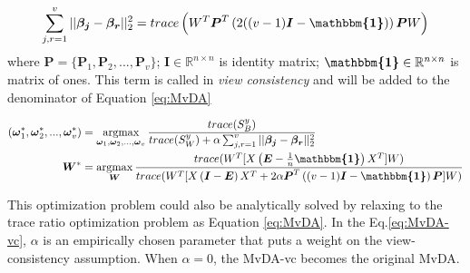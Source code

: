         \begin{equation}
            \sum_{j,r=1}^{v}||\boldsymbol{\beta_j} - \boldsymbol{\beta_r}||_2^2 = trace\left(W^{T}\boldsymbol{P}^{T}\left(2((v - 1)\boldsymbol{I} - \boldsymbol{\mathbbm{1}})\right)\boldsymbol{P}W\right)
        \end{equation}
        where $\boldsymbol{P} = \{\boldsymbol{P}_1,\boldsymbol{P}_2,...,\boldsymbol{P}_v\}$; $\boldsymbol{I} \in \mathbb{R}^{n\times n}$ is identity matrix; $\boldsymbol{\mathbbm{1}} \in \mathbb{R}^{n\times n}$ is matrix of ones.
        This term is called in \cite{kan2016multi} {\itshape view consistency} and will be added to the denominator of Equation \eqref{eq:MvDA}

        \begin{align}
            (\boldsymbol{\omega}_1^*,\boldsymbol{\omega}_2^*, ..., \boldsymbol{\omega}_v^*) &= \operatorname*{argmax}_{\boldsymbol{\omega}_1, \boldsymbol{\omega}_2,..., \boldsymbol{\omega}_v}\frac{trace({S}_B^y)}{trace({S}_W^y) + \alpha\sum_{j,r=1}^{v}||\boldsymbol{\beta_j} - \boldsymbol{\beta_r}||_2^2}\\
            \boldsymbol{W}^* &= \operatorname*{argmax}_{\boldsymbol{W}}\frac{trace(W^{T}[X\left(\boldsymbol{E} - \frac{1}{n}\boldsymbol{\mathbbm{1}}\right)X^{T}]W)}{trace(W^{T}[X\left(\boldsymbol{I} - \boldsymbol{E}\right)X^{T} + 2\alpha\boldsymbol{P}^T\left((v - 1)\boldsymbol{I} - \boldsymbol{\mathbbm{1}}\right)\boldsymbol{P}]W)}
            \label{eq:MvDA-vc}
        \end{align}

        This optimization problem could also be analytically solved by relaxing to the trace ratio optimization problem as Equation \eqref{eq:MvDA}.
        In the Eq.\eqref{eq:MvDA-vc}, $\alpha$ is an empirically chosen parameter that puts a weight on the view-consistency assumption.
        When $\alpha = 0$, the MvDA-vc becomes the original MvDA. 
